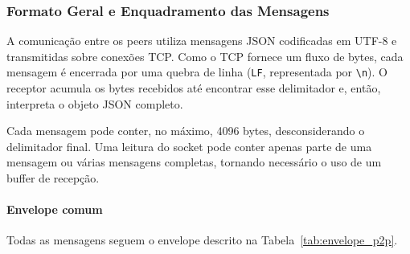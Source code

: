 \documentclass[11pt,a4paper]{article}
\begin{document}

\subsubsection{Formato Geral e Enquadramento das Mensagens}
\label{sec:formato-p2p}

A comunicação entre os peers utiliza mensagens JSON codificadas em UTF-8 e transmitidas sobre conexões TCP. Como o TCP fornece um fluxo de bytes, cada mensagem é encerrada por uma quebra de linha (\texttt{LF}, representada por \texttt{\textbackslash n}). O receptor acumula os bytes recebidos até encontrar esse delimitador e, então, interpreta o objeto JSON completo.

Cada mensagem pode conter, no máximo, 4096 bytes, desconsiderando o delimitador final. Uma leitura do socket pode conter apenas parte de uma mensagem ou várias mensagens completas, tornando necessário o uso de um buffer de recepção.

\paragraph{Envelope comum}

Todas as mensagens seguem o envelope descrito na Tabela~\ref{tab:envelope_p2p}.
\end{document}
